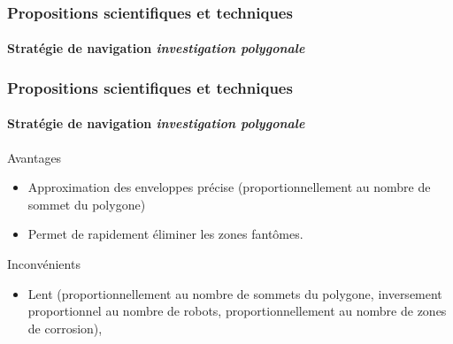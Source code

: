 \documentclass{beamer}
\begin{document}
			\begin{frame}
				\frametitle{Propositions scientifiques et techniques}
				\framesubtitle{Stratégie de navigation \textit{investigation polygonale}}
				\begin{figure}[H]
					\centering
				\end{figure}
			\end{frame}
			\begin{frame}
				\frametitle{Propositions scientifiques et techniques}
				\framesubtitle{Stratégie de navigation \textit{investigation polygonale}}
				\begin{exampleblock}{Avantages}
					\begin{itemize}
						\item Approximation des enveloppes précise (proportionnellement au nombre de sommet du polygone)
						\item Permet de rapidement éliminer les zones fantômes.
					\end{itemize}
				\end{exampleblock}
				\begin{alertblock}{Inconvénients}
					\begin{itemize}
						\item Lent (proportionnellement au nombre de sommets du polygone, inversement proportionnel au nombre de robots, proportionnellement au nombre de zones de corrosion),
					\end{itemize}
				\end{alertblock}
			\end{frame}
\end{document}
